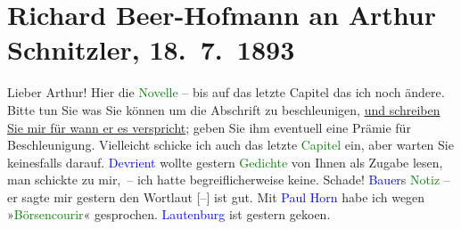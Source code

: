 

               \section[Richard Beer-Hofmann an Arthur Schnitzler, 18. 7. 1893]{ Richard Beer-Hofmann an Arthur Schnitzler, 18. 7. 1893}\nopagebreak{}\rehead{ }\normalsize\beginnumbering{} \toendnotes[C]{\smallbreak\pagebreak[2]} 
\toendnotes[C]{\smallbreak}\pstart
           \noindent{}{\pb}Lieber Arthur! Hier
               die \textcolor{green}{Novelle}{} – bis auf das letzte
               Capitel das ich noch ändere. Bitte tun Sie was Sie können um die Abschrift zu
               beschleunigen, \uline{und schreiben Sie mir \introOben{}für\introOben{} wann er es verspricht}; geben Sie ihm eventuell eine Prämie für
               Beschleunigung. Vielleicht schicke ich auch das letzte \textcolor{green}{Capitel}{} ein, aber warten Sie keinesfalls darauf.\pend
           \pstart
           \textcolor{blue}{Devrient}{}\ledrightnote{\textcolor{blue}{Max Devrient}} wollte gestern \textcolor{green}{Gedichte}{} von Ihnen als Zugabe lesen, man
               schickte zu mir, – ich hatte begreiflicherweise keine. Schade! \textcolor{blue}{Bauer}{}\ledrightnote{\textcolor{blue}{Ludwig Bauer}}s \textcolor{green}{Notiz}{} – er sagte mir gestern den Wortlaut {[}–{]} ist gut.
               Mit \textcolor{blue}{Paul Horn}{}\ledrightnote{\textcolor{blue}{Paul Horn}} habe ich wegen »\textcolor{green}{\textcolor{green}{Börsencourir}{}\ledrightnote{\textcolor{green}{Berliner Börsen-Courier}}}{}« gesprochen. \textcolor{blue}{Lautenburg}{}\ledrightnote{\textcolor{blue}{Sigmund Lautenburg}} ist {\pb} gestern geko{\geminationm}en.\pend
